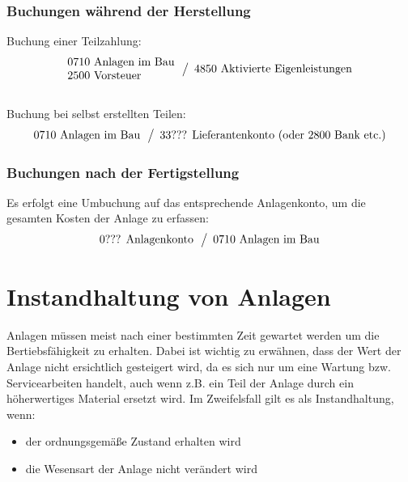 \documentclass[a4paper,10pt]{report}
\begin{document}
\subsection{Buchungen während der Herstellung}
Buchung einer Teilzahlung:
\begin{equation*}
  \begin{array}{l}
    \text{0710 Anlagen im Bau}\\
    \text{2500 Vorsteuer}\\
  \end{array}
  \left\slash
    \begin{array}{l}
      \text{4850 Aktivierte Eigenleistungen}\\
    \end{array}
  \right.
\end{equation*}
\\
Buchung bei selbst erstellten Teilen:
\begin{equation*}
  \begin{array}{l}
    \text{0710 Anlagen im Bau}\\
  \end{array}
  \left\slash
    \begin{array}{l}
      \text{33??? Lieferantenkonto (oder 2800 Bank etc.)}\\
    \end{array}
  \right.
\end{equation*}

\subsection{Buchungen nach der Fertigstellung}
Es erfolgt eine Umbuchung auf das entsprechende Anlagenkonto, um die
gesamten Kosten der Anlage zu erfassen:
\begin{equation*}
  \begin{array}{l}
    \text{0??? Anlagenkonto}\\
  \end{array}
  \left\slash
    \begin{array}{l}
      \text{0710 Anlagen im Bau}\\
    \end{array}
  \right.
\end{equation*}

\chapter{Instandhaltung von Anlagen}
\thispagestyle{fancy}
Anlagen müssen meist nach einer bestimmten Zeit gewartet werden um die
Bertiebsfähigkeit zu erhalten. Dabei ist wichtig zu erwähnen, dass der
Wert der Anlage nicht ersichtlich gesteigert wird, da es sich nur um
eine Wartung bzw. Servicearbeiten handelt, auch wenn z.B. ein Teil der
Anlage durch ein höherwertiges Material ersetzt wird. Im Zweifelsfall
gilt es als Instandhaltung, wenn:
\begin{itemize}
  \item der ordnungsgemäße Zustand erhalten wird
  \item die Wesensart der Anlage nicht verändert wird
\end{itemize}
\end{document}
